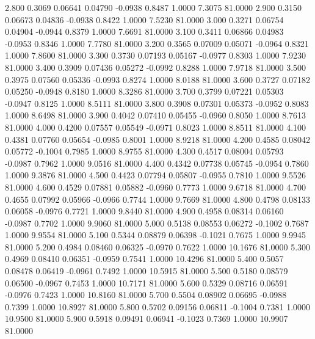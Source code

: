    2.800   0.3069   0.06641   0.04790  -0.0938   0.8487   1.0000   7.3075  81.0000
   2.900   0.3150   0.06673   0.04836  -0.0938   0.8422   1.0000   7.5230  81.0000
   3.000   0.3271   0.06754   0.04904  -0.0944   0.8379   1.0000   7.6691  81.0000
   3.100   0.3411   0.06866   0.04983  -0.0953   0.8346   1.0000   7.7780  81.0000
   3.200   0.3565   0.07009   0.05071  -0.0964   0.8321   1.0000   7.8600  81.0000
   3.300   0.3730   0.07193   0.05167  -0.0977   0.8303   1.0000   7.9230  81.0000
   3.400   0.3909   0.07436   0.05272  -0.0992   0.8288   1.0000   7.9718  81.0000
   3.500   0.3975   0.07560   0.05336  -0.0993   0.8274   1.0000   8.0188  81.0000
   3.600   0.3727   0.07182   0.05250  -0.0948   0.8180   1.0000   8.3286  81.0000
   3.700   0.3799   0.07221   0.05303  -0.0947   0.8125   1.0000   8.5111  81.0000
   3.800   0.3908   0.07301   0.05373  -0.0952   0.8083   1.0000   8.6498  81.0000
   3.900   0.4042   0.07410   0.05455  -0.0960   0.8050   1.0000   8.7613  81.0000
   4.000   0.4200   0.07557   0.05549  -0.0971   0.8023   1.0000   8.8511  81.0000
   4.100   0.4381   0.07760   0.05654  -0.0985   0.8001   1.0000   8.9218  81.0000
   4.200   0.4585   0.08042   0.05772  -0.1004   0.7985   1.0000   8.9755  81.0000
   4.300   0.4517   0.08004   0.05793  -0.0987   0.7962   1.0000   9.0516  81.0000
   4.400   0.4342   0.07738   0.05745  -0.0954   0.7860   1.0000   9.3876  81.0000
   4.500   0.4423   0.07794   0.05807  -0.0955   0.7810   1.0000   9.5526  81.0000
   4.600   0.4529   0.07881   0.05882  -0.0960   0.7773   1.0000   9.6718  81.0000
   4.700   0.4655   0.07992   0.05966  -0.0966   0.7744   1.0000   9.7669  81.0000
   4.800   0.4798   0.08133   0.06058  -0.0976   0.7721   1.0000   9.8440  81.0000
   4.900   0.4958   0.08314   0.06160  -0.0987   0.7702   1.0000   9.9060  81.0000
   5.000   0.5138   0.08553   0.06272  -0.1002   0.7687   1.0000   9.9554  81.0000
   5.100   0.5344   0.08879   0.06398  -0.1021   0.7675   1.0000   9.9945  81.0000
   5.200   0.4984   0.08460   0.06325  -0.0970   0.7622   1.0000  10.1676  81.0000
   5.300   0.4969   0.08410   0.06351  -0.0959   0.7541   1.0000  10.4296  81.0000
   5.400   0.5057   0.08478   0.06419  -0.0961   0.7492   1.0000  10.5915  81.0000
   5.500   0.5180   0.08579   0.06500  -0.0967   0.7453   1.0000  10.7171  81.0000
   5.600   0.5329   0.08716   0.06591  -0.0976   0.7423   1.0000  10.8160  81.0000
   5.700   0.5504   0.08902   0.06695  -0.0988   0.7399   1.0000  10.8927  81.0000
   5.800   0.5702   0.09156   0.06811  -0.1004   0.7381   1.0000  10.9500  81.0000
   5.900   0.5918   0.09491   0.06941  -0.1023   0.7369   1.0000  10.9907  81.0000
